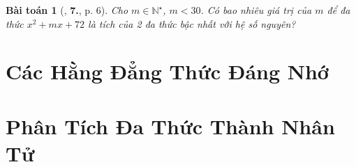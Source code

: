 \documentclass{article}
\numberwithin{equation}{section}
\newtheorem{baitoan}{Bài toán}[section]
\begin{document}
\begin{baitoan}[\cite{Tuyen_Toan_8}, \textbf{7.}, p. 6]
	Cho $m\in\mathbb{N}^\star$, $m < 30$. Có bao nhiêu giá trị của $m$ để đa thức $x^2 + mx + 72$ là tích của 2 đa thức bậc nhất với hệ số nguyên?
\end{baitoan}


\section{Các Hằng Đẳng Thức Đáng Nhớ}


\section{Phân Tích Đa Thức Thành Nhân Tử}


\printbibliography[heading=bibintoc]
	
\end{document}
